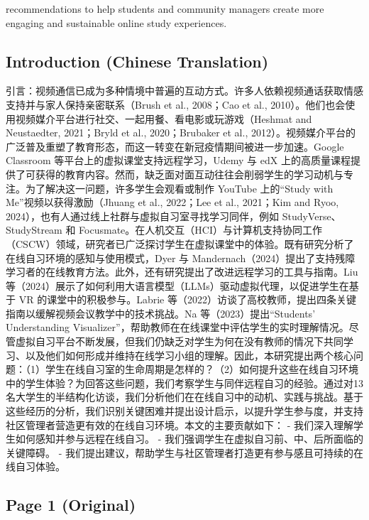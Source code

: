 \documentclass[12pt]{ctexart}
\begin{document}
recommendations to help students and community managers create more engaging and sustainable online study experiences.

\subsection*{Introduction (Chinese Translation)}

引言：视频通信已成为多种情境中普遍的互动方式。许多人依赖视频通话获取情感支持并与家人保持亲密联系（Brush et al., 2008；Cao et al., 2010）。他们也会使用视频媒介平台进行社交、一起用餐、看电影或玩游戏（Heshmat and Neustaedter, 2021；Bryld et al., 2020；Brubaker et al., 2012）。视频媒介平台的广泛普及重塑了教育形态，而这一转变在新冠疫情期间被进一步加速。Google Classroom 等平台上的虚拟课堂支持远程学习，Udemy 与 edX 上的高质量课程提供了可获得的教育内容。然而，缺乏面对面互动往往会削弱学生的学习动机与专注。为了解决这一问题，许多学生会观看或制作 YouTube 上的“Study with Me”视频以获得激励（Jhuang et al., 2022；Lee et al., 2021；Kim and Ryoo, 2024），也有人通过线上社群与虚拟自习室寻找学习同伴，例如 StudyVerse、StudyStream 和 Focusmate。在人机交互（HCI）与计算机支持协同工作（CSCW）领域，研究者已广泛探讨学生在虚拟课堂中的体验。既有研究分析了在线自习环境的感知与使用模式，Dyer 与 Mandernach（2024）提出了支持残障学习者的在线教育方法。此外，还有研究提出了改进远程学习的工具与指南。Liu 等（2024）展示了如何利用大语言模型（LLMs）驱动虚拟代理，以促进学生在基于 VR 的课堂中的积极参与。Labrie 等（2022）访谈了高校教师，提出四条关键指南以缓解视频会议教学中的技术挑战。Na 等（2023）提出“Students’ Understanding Visualizer”，帮助教师在在线课堂中评估学生的实时理解情况。尽管虚拟自习平台不断发展，但我们仍缺乏对学生为何在没有教师的情况下共同学习、以及他们如何形成并维持在线学习小组的理解。因此，本研究提出两个核心问题：（1）学生在线自习室的生命周期是怎样的？（2）如何提升这些在线自习环境中的学生体验？为回答这些问题，我们考察学生与同伴远程自习的经验。通过对13名大学生的半结构化访谈，我们分析他们在在线自习中的动机、实践与挑战。基于这些经历的分析，我们识别关键困难并提出设计启示，以提升学生参与度，并支持社区管理者营造更有效的在线自习环境。本文的主要贡献如下：
- 我们深入理解学生如何感知并参与远程在线自习。
- 我们强调学生在虚拟自习前、中、后所面临的关键障碍。
- 我们提出建议，帮助学生与社区管理者打造更有参与感且可持续的在线自习体验。


\subsection*{Page 1 (Original)}
\end{document}
